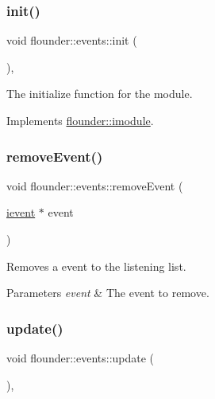 \subsubsection{\texorpdfstring{init()}{init()}}
{\footnotesize\ttfamily void flounder\+::events\+::init (\begin{DoxyParamCaption}{ }\end{DoxyParamCaption})\hspace{0.3cm}{\ttfamily [override]}, {\ttfamily [virtual]}}



The initialize function for the module. 



Implements \hyperlink{classflounder_1_1imodule_a1725ef346952884d0741de61aba1e0c7}{flounder\+::imodule}.

\mbox{\label{classflounder_1_1events_a957a88d282b2caa50cc87bbe039de095}} 
\subsubsection{\texorpdfstring{remove\+Event()}{removeEvent()}}
{\footnotesize\ttfamily void flounder\+::events\+::remove\+Event (\begin{DoxyParamCaption}\item[{\hyperlink{classflounder_1_1ievent}{ievent} $\ast$}]{event }\end{DoxyParamCaption})}



Removes a event to the listening list. 


\begin{DoxyParams}{Parameters}
{\em event} & The event to remove. \\
\hline
\end{DoxyParams}
\mbox{\label{classflounder_1_1events_a7fc08fdb5dc615a924dd0d55996747dc}} 
\subsubsection{\texorpdfstring{update()}{update()}}
{\footnotesize\ttfamily void flounder\+::events\+::update (\begin{DoxyParamCaption}{ }\end{DoxyParamCaption})\hspace{0.3cm}{\ttfamily [override]}, {\ttfamily [virtual]}}



